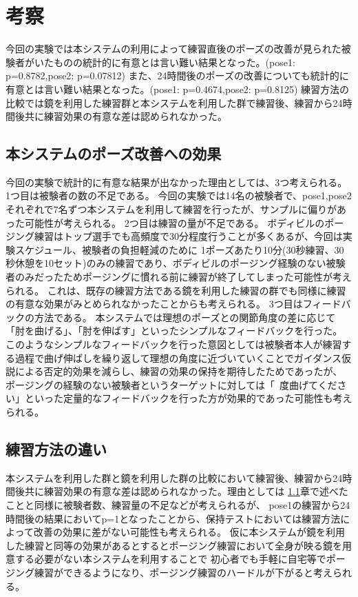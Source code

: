 \chapter{考察}
\label{consideration}
今回の実験では本システムの利用によって練習直後のポーズの改善が見られた被験者がいたものの統計的に有意とは言い難い結果となった。(pose1: p=0.8782,pose2: p=0.07812)
また、24時間後のポーズの改善についても統計的に有意とは言い難い結果となった。(pose1: p=0.4674,pose2: p=0.8125)
練習方法の比較では鏡を利用した練習群と本システムを利用した群で練習後、練習から24時間後共に練習効果の有意な差は認められなかった。

\section{本システムのポーズ改善への効果}
\label{sec:pose_improvement_from_system}
今回の実験で統計的に有意な結果が出なかった理由としては、3つ考えられる。
1つ目は被験者の数の不足である。
今回の実験では14名の被験者で、pose1,pose2それぞれで7名ずつ本システムを利用して練習を行ったが、サンプルに偏りがあった可能性が考えられる。
2つ目は練習の量が不足である。
ボディビルのポージング練習はトップ選手でも高頻度で30分程度行うことが多くあるが、今回は実験スケジュール、被験者の負担軽減のために
1ポーズあたり10分(30秒練習、30秒休憩を10セット)のみの練習であり、ボディビルのポージング経験のない被験者のみだったためポージングに慣れる前に練習が終了してしまった可能性が考えられる。
これは、既存の練習方法である鏡を利用した練習の群でも同様に練習の有意な効果がみとめられなかったことからも考えられる。
3つ目はフィードバックの方法である。
本システムでは理想のポーズとの関節角度の差に応じて「肘を曲げる」、「肘を伸ばす」といったシンプルなフィードバックを行った。
このようなシンプルなフィードバックを行った意図としては被験者本人が練習する過程で曲げ伸ばしを繰り返して理想の角度に近づいていくことでガイダンス仮説による否定的効果を減らし、練習の効果の保持を期待したためであったが、
ポージングの経験のない被験者というターゲットに対しては「~度曲げてください」といった定量的なフィードバックを行った方が効果的であった可能性も考えられる。

\section{練習方法の違い}
本システムを利用した群と鏡を利用した群の比較において練習後、練習から24時間後共に練習効果の有意な差は認められなかった。理由としては
\ref{sec:pose_improvement_from_system}章で述べたことと同様に被験者数、練習量の不足などが考えられるが、
pose1の練習から24時間後の結果においてp=1となったことから、保持テストにおいては練習方法によって改善の効果に差がない可能性も考えられる。
仮に本システムが鏡を利用した練習と同等の効果があるとするとポージング練習において全身が映る鏡を用意する必要がない本システムを利用することで
初心者でも手軽に自宅等でポージング練習ができるようになり、ポージング練習のハードルが下がると考えられる。